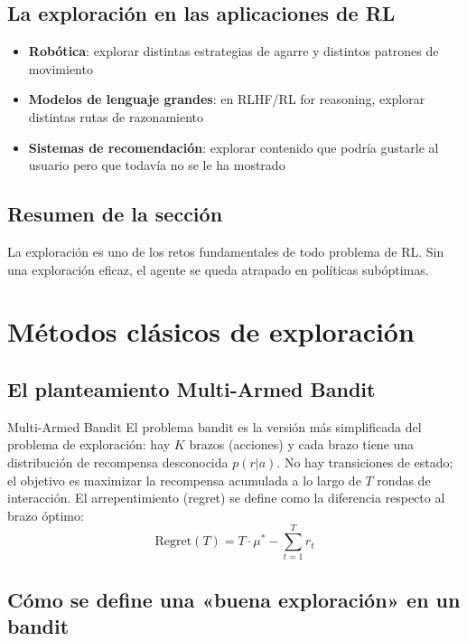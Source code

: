 \documentclass[a4paper]{article}
\begin{document}
\subsection{La exploración en las aplicaciones de RL}

\begin{itemize}
    \item \textbf{Robótica}: explorar distintas estrategias de agarre y distintos patrones de movimiento
    \item \textbf{Modelos de lenguaje grandes}: en RLHF/RL for reasoning, explorar distintas rutas de razonamiento
    \item \textbf{Sistemas de recomendación}: explorar contenido que podría gustarle al usuario pero que todavía no se le ha mostrado
\end{itemize}

\subsection{Resumen de la sección}

La exploración es uno de los retos fundamentales de todo problema de RL. Sin una exploración eficaz, el agente se queda atrapado en políticas subóptimas.
\section{Métodos clásicos de exploración}

\subsection{El planteamiento Multi-Armed Bandit}

\begin{knowledgebox}{Multi-Armed Bandit}
El problema bandit es la versión más simplificada del problema de exploración: hay $K$ brazos (acciones) y cada brazo tiene una distribución de recompensa desconocida $p(r | a)$. No hay transiciones de estado; el objetivo es maximizar la recompensa acumulada a lo largo de $T$ rondas de interacción. El arrepentimiento (regret) se define como la diferencia respecto al brazo óptimo:
$$\text{Regret}(T) = T \cdot \mu^* - \sum_{t=1}^T r_t$$
\end{knowledgebox}

\subsection{Cómo se define una «buena exploración» en un bandit}
\end{document}
